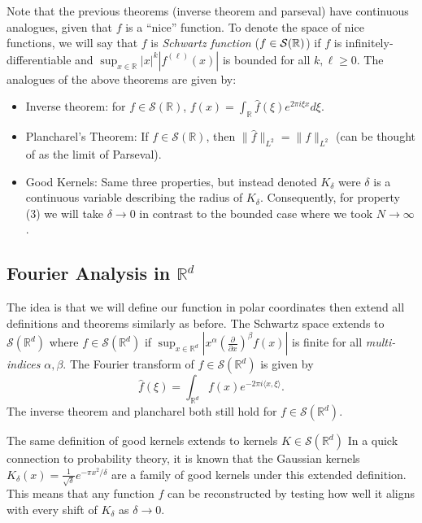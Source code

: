 \documentclass[12pt]{article}
\begin{document}
Note that the previous theorems (inverse theorem and parseval) 
have continuous analogues, given that $f$ is a ``nice'' function.
To denote the space of nice functions, we will say that $f$ is 
{\it Schwartz function} ($f \in \cal{S}(\mathbb{R})$) if $f$ is
infinitely-differentiable and $\sup_{x\in\mathbb{R}}|x|^k|f^{(\ell)}(x)|$
is bounded for all $k,\ell\geq 0$.
The analogues of the above theorems are given by:
\begin{itemize}
\item Inverse theorem: for $f \in \mathcal{S}(\mathbb{R})$,
$f(x) = \int_\mathbb{R} \hat{f}(\xi)e^{2\pi i\xi x} d\xi$.
\item Plancharel's Theorem: If $f\in \mathcal{S}(\mathbb{R})$, then 
$\|\hat{f}\|_{L^2} = \|f\|_{L^2}$ (can be thought of as the limit of Parseval).
\item Good Kernels: Same three properties, but instead denoted $K_\delta$ were
$\delta$ is a continuous variable describing the radius of $K_\delta$.
Consequently, for property (3) we will take $\delta\rightarrow 0$ in contrast
to the bounded case where we took $N\rightarrow\infty$.
\end{itemize}

\subsection*{Fourier Analysis in $\mathbb{R}^d$}

The idea is that we will define our function in polar coordinates then
extend all definitions and theorems similarly as before.
The Schwartz space extends to $\mathcal{S}(\mathbb{R}^d)$ where
$f\in\mathcal{S}(\mathbb{R}^d)$ if
$\sup_{x\in\mathbb{R}^d}|x^\alpha (\frac{\partial}{\partial x})^\beta f(x)|$
is finite for all {\it multi-indices} $\alpha,\beta$.
The Fourier transform of $f\in\mathcal{S}(\mathbb{R}^d)$ is given by
$$\hat{f}(\xi) = \int_{\mathbb{R}^d} f(x) e^{-2\pi i \langle x,\xi \rangle}.$$
The inverse theorem and plancharel both still hold for 
$f \in\mathcal{S}(\mathbb{R}^d)$.

The same definition of good kernels extends to kernels 
$K \in\mathcal{S}(\mathbb{R}^d)$ 
In a quick connection to probability theory, it is known that the Gaussian 
kernels $K_\delta(x) = \frac{1}{\sqrt{\delta}}e^{-\pi x^2/\delta}$ are a 
family of good kernels under this extended definition.
This means that any function $f$ can be reconstructed by testing how well
it aligns with every shift of $K_\delta$ as $\delta\rightarrow 0$.
\end{document}
